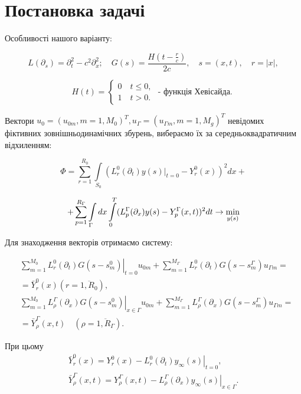 \chapter{Постановка задачі}


Особливості нашого варіанту:


$$ L(\partial_s)=\partial_t^2-c^2 \partial_x^2 ; \quad G(s)=\frac{H(t- \frac{r}{c})}{2 c}, \quad s=(x, t), \quad r=|x|,$$

$$H(t)=\begin{cases}0 \quad  t \leq 0, \\ 1 \quad t>0 .\end{cases} \text { - функція Хевісайда. }$$


Вектори $ u_0 = (u_{0m} , m= 1, M_0)^T, u_\Gamma = (u_{\Gamma m} , m= 1, M_g)^T $ 
невідомих фіктивних зовнішньодинамічних збурень, вибераємо їх за середньоквадратичним відхиленням:


$$ \Phi = \sum_{r=1}^{R_0} \int\limits_{S_0}(L_r^0(\partial_t)y(s)|_{t=0} - Y_r^0(x))^2dx + $$


$$+\sum_{p=1}^{R_\Gamma}\int\limits_{\Gamma}dx\int\limits_{0}^{T} (L_p^\Gamma(\partial_x)y(s) - Y_p^\Gamma(x,t))^2dt \rightarrow \displaystyle\min_{y(s)}$$


Для знаходження векторів отримаємо систему:


$$
\begin{aligned}
& \left.\sum_{m=1}^{M_0} L_r^0\left(\partial_t\right) G\left(s-s_m^0\right)\right|_{t=0} u_{0 m}+\sum_{m=1}^{M_{\Gamma}} L_r^0\left(\partial_t\right) G\left(s-s_m^{\Gamma}\right) u_{\Gamma m}= \\
& =\bar{Y}_r^0(x)\left(r=\overline{1, R_0}\right), \\
& \left.\sum_{m=1}^{M_0} L_\rho^{\Gamma}\left(\partial_x\right) G\left(s-s_m^0\right)\right|_{x \in \Gamma} u_{0 m}+\sum_{m=1}^{M_{\Gamma}} L_\rho^{\Gamma}\left(\partial_x\right) G\left(s-s_m^{\Gamma}\right) u_{\Gamma m}= \\
& =\bar{Y}_\rho^{\Gamma}(x, t) \quad\left(\rho=\overline{1, R_{\Gamma}}\right) .
\end{aligned}
$$

При цьому
$$
\begin{gathered}
\bar{Y}_r^0(x)=Y_r^0(x)-\left.L_r^0\left(\partial_t\right) y_{\infty}(s)\right|_{t=0}, \\
\bar{Y}_\rho^{\Gamma}(x, t)=Y_\rho^{\Gamma}(x, t)-\left.L_\rho^{\Gamma}\left(\partial_x\right) y_{\infty}(s)\right|_{x \in \Gamma} .
\end{gathered}
$$


